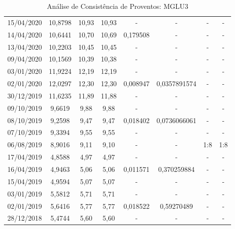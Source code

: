 \begin{table}[h!]
\begin{center}
{\begin{tabular}{ c|ccc|cc|cc }
            15/04/2020 & \color{orange} 10,8798 \color{black} & 10,93 & 10,93 & - & - & - & - \\
            14/04/2020 & \color{orange} 10,6441 \color{black} & 10,70 & 10,69 & \color{red} 0,179508 \color{black} & - & - & - \\
            13/04/2020 & \color{orange} 10,2203 \color{black} & 10,45 & 10,45 & - & - & - & - \\
            09/04/2020 & \color{orange} 10,1569 \color{black} & 10,39 & 10,38 & - & - & - & - \\

            03/01/2020 & \color{orange} 11,9224 \color{black} & 12,19 & 12,19 & - & - & - & - \\
            02/01/2020 & \color{orange} 12,0297 \color{black} & 12,30 & 12,30 & \color{blue} 0,008947 \color{black} & 0,0357891574 & - & - \\
            30/12/2019 & \color{orange} 11,6235 \color{black} & 11,89 & 11,88 & - & - & - & - \\

            09/10/2019 & \color{orange} 9,6619 \color{black} & 9,88 & 9,88 & - & - & - & - \\
            08/10/2019 & \color{orange} 9,2598 \color{black} & 9,47 & 9,47 & \color{blue} 0,018402 \color{black} & 0,0736066061 & - & - \\
            07/10/2019 & \color{orange} 9,3394 \color{black} & 9,55 & 9,55 & - & - & - & - \\

            06/08/2019 & \color{orange} 8,9016 \color{black} & 9,11 & 9,10 & - & - & \color{blue} 1:8 \color{black} & 1:8 \\

            17/04/2019 & \color{orange} 4,8588 \color{black} & 4,97 & 4,97 & - & - & - & - \\
            16/04/2019 & \color{orange} 4,9463 \color{black} & 5,06 & 5,06 & \color{blue} 0,011571 \color{black} & 0,370259884 & - & - \\
            15/04/2019 & \color{orange} 4,9594 \color{black} & 5,07 & 5,07 & - & - & - & - \\

            03/01/2019 & \color{orange} 5,5812 \color{black} & 5,71 & 5,71 & - & - & - & - \\
            02/01/2019 & \color{orange} 5,6416 \color{black} & 5,77 & 5,77 & \color{blue} 0,018522 \color{black} & 0,59270489 & - & - \\
            28/12/2018 & \color{orange} 5,4744 \color{black} & 5,60 & 5,60 & - & - & - & - \\

        \end{tabular}}
        \caption{Análise de Consistência de Proventos: MGLU3}
        \label{tab:ap1}
    \end{center}
\end{table}

